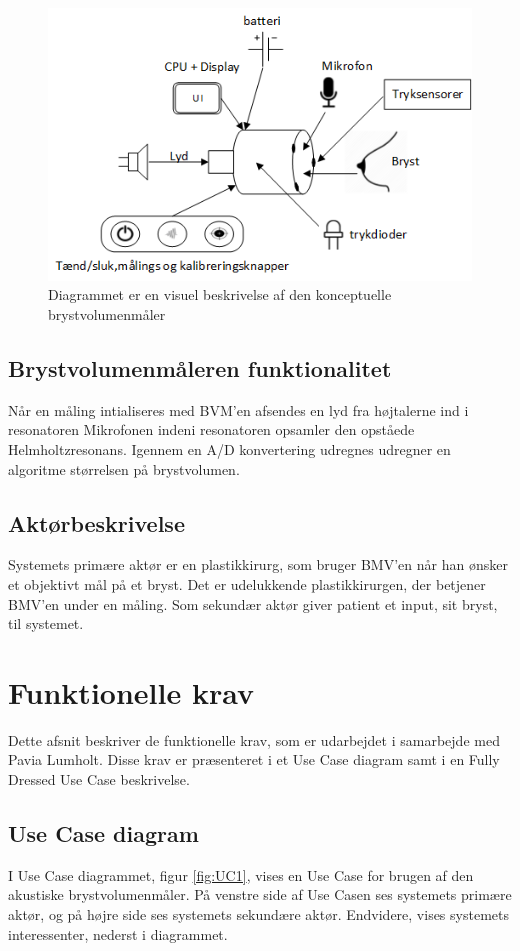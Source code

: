 		\begin{figure}[htb]
			\centering
				\includegraphics[width=5in]{Ksys}
				\caption{Diagrammet er en visuel beskrivelse af den konceptuelle brystvolumenmåler}	
				\label{fig:ksys}
			\end{figure}	     
		
	
		\subsection{Brystvolumenmåleren funktionalitet}
		Når en måling intialiseres med BVM'en afsendes en lyd fra højtalerne ind i resonatoren  Mikrofonen indeni resonatoren opsamler den opståede Helmholtzresonans. Igennem en A/D konvertering udregnes  udregner en algoritme størrelsen på brystvolumen. 
	
		\subsection{Aktørbeskrivelse}
		Systemets primære aktør er en plastikkirurg, som bruger BMV'en når han ønsker et objektivt mål på et bryst. Det er udelukkende plastikkirurgen, der  betjener BMV'en under en måling. Som sekundær aktør giver patient et input, sit bryst, til systemet. 
	
	\section{Funktionelle krav}	
	Dette afsnit beskriver de funktionelle krav, som er udarbejdet i samarbejde med Pavia Lumholt. Disse krav er præsenteret i et Use Case diagram samt i en Fully Dressed Use Case beskrivelse.  
	
	\pagebreak
	
		\subsection{Use Case diagram}
		I Use Case diagrammet, figur \ref{fig:UC1}, vises en Use Case for brugen af den akustiske brystvolumenmåler. På venstre side af Use Casen ses systemets primære aktør, og på højre side ses systemets sekundære aktør. Endvidere, vises systemets interessenter, nederst i diagrammet.  
	
